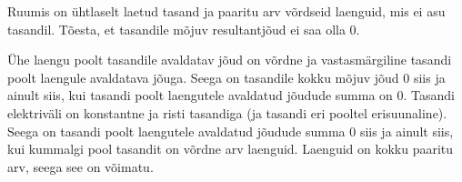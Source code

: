 
Ruumis on ühtlaselt laetud tasand ja paaritu arv võrdseid laenguid, mis ei asu tasandil. Tõesta, et tasandile mõjuv resultantjõud ei saa olla 0.


\hint

\solu
Ühe laengu poolt tasandile avaldatav jõud on võrdne ja vastasmärgiline tasandi poolt laengule avaldatava jõuga. Seega on tasandile kokku mõjuv jõud 0 siis ja ainult siis, kui tasandi poolt laengutele avaldatud jõudude summa on 0. Tasandi elektriväli on konstantne ja risti tasandiga (ja tasandi eri pooltel erisuunaline). Seega on tasandi poolt laengutele avaldatud jõudude summa 0 siis ja ainult siis, kui kummalgi pool tasandit on võrdne arv laenguid. Laenguid on kokku paaritu arv, seega see on võimatu.
\probend